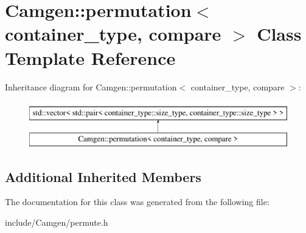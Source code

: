 \hypertarget{a00411}{\section{Camgen\-:\-:permutation$<$ container\-\_\-type, compare $>$ Class Template Reference}
\label{a00411}
}
Inheritance diagram for Camgen\-:\-:permutation$<$ container\-\_\-type, compare $>$\-:\begin{figure}[H]
\begin{center}
\leavevmode
\includegraphics[height=2.000000cm]{a00411}
\end{center}
\end{figure}
\subsection*{Additional Inherited Members}


The documentation for this class was generated from the following file\-:\begin{DoxyCompactItemize}
\item 
include/\-Camgen/permute.\-h\end{DoxyCompactItemize}
